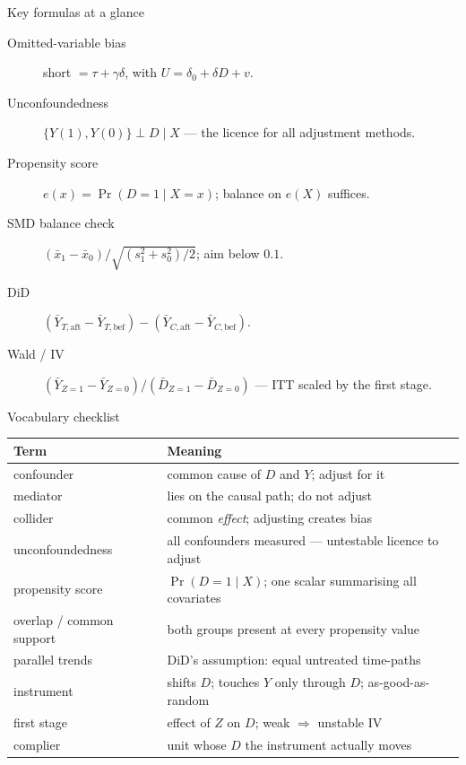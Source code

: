 \documentclass[aspectratio=169,11pt]{beamer}
\begin{document}
\begin{frame}{Key formulas at a glance}
  \footnotesize
  \begin{description}
    \item[Omitted-variable bias] short $= \tau + \gamma\delta$, with
      $U = \delta_0 + \delta D + v$.
    \item[Unconfoundedness] $\{Y(1), Y(0)\} \perp D \mid X$ --- the licence for all
      adjustment methods.
    \item[Propensity score] $e(x) = \Pr(D=1 \mid X=x)$; balance on $e(X)$ suffices.
    \item[SMD balance check] $(\bar x_1 - \bar x_0)\big/\sqrt{(s_1^2 + s_0^2)/2}$;
      aim below $0.1$.
    \item[DiD] $(\bar Y_{T,\text{aft}} - \bar Y_{T,\text{bef}}) -
      (\bar Y_{C,\text{aft}} - \bar Y_{C,\text{bef}})$.
    \item[Wald / IV] $(\bar Y_{Z=1} - \bar Y_{Z=0}) \big/
      (\bar D_{Z=1} - \bar D_{Z=0})$ --- ITT scaled by the first stage.
  \end{description}
\end{frame}

\begin{frame}{Vocabulary checklist}
  \footnotesize
  \begin{center}
  \begin{tabular}{@{}ll@{}}
    \toprule
    \textbf{Term} & \textbf{Meaning} \\
    \midrule
    confounder & common cause of $D$ and $Y$; adjust for it \\
    mediator & lies on the causal path; do not adjust \\
    collider & common \emph{effect}; adjusting creates bias \\
    unconfoundedness & all confounders measured --- untestable licence to adjust \\
    propensity score & $\Pr(D=1\mid X)$; one scalar summarising all covariates \\
    overlap / common support & both groups present at every propensity value \\
    parallel trends & DiD's assumption: equal untreated time-paths \\
    instrument & shifts $D$; touches $Y$ only through $D$; as-good-as-random \\
    first stage & effect of $Z$ on $D$; weak $\Rightarrow$ unstable IV \\
    complier & unit whose $D$ the instrument actually moves \\
    \bottomrule
  \end{tabular}
  \end{center}
\end{frame}
\end{document}
